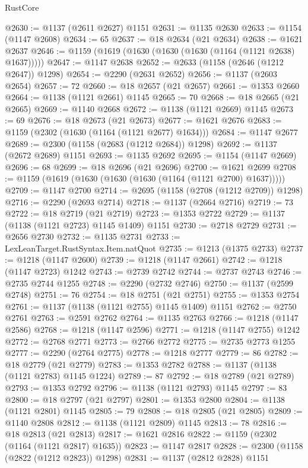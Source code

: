 \begin{lexlean}{RustCore}
\begin{coremodule}
@2630 := @1137 (@2611 @2627) @1151
@2631 := @1135 @2630
@2633 := @1154 (@1147 @2608)
@2634 := 65
@2637 := @18 @2634 (@21 @2634)
@2638 := @1621 @2637
@2646 := @1159 (@1619 (@1630 (@1630 (@1630 (@1164 (@1121 @2638) @1637)))))
@2647 := @1147 @2638
@2652 := @2633 (@1158 (@2646 (@1212 @2647)) @1298)
@2654 := @2290 (@2631 @2652)
@2656 := @1137 (@2603 @2654)
@2657 := 72
@2660 := @18 @2657 (@21 @2657)
@2661 := @1353 @2660
@2664 := @1138 (@1121 @2661) @1145
@2665 := 70
@2668 := @18 @2665 (@21 @2665)
@2669 := @1140 @2668
@2672 := @1138 (@1121 @2669) @1145
@2673 := 69
@2676 := @18 @2673 (@21 @2673)
@2677 := @1621 @2676
@2683 := @1159 (@2302 (@1630 (@1164 (@1121 @2677) @1634)))
@2684 := @1147 @2677
@2689 := @2300 (@1158 (@2683 (@1212 @2684)) @1298)
@2692 := @1137 (@2672 @2689) @1151
@2693 := @1135 @2692
@2695 := @1154 (@1147 @2669)
@2696 := 68
@2699 := @18 @2696 (@21 @2696)
@2700 := @1621 @2699
@2708 := @1159 (@1619 (@1630 (@1630 (@1630 (@1164 (@1121 @2700) @1637)))))
@2709 := @1147 @2700
@2714 := @2695 (@1158 (@2708 (@1212 @2709)) @1298)
@2716 := @2290 (@2693 @2714)
@2718 := @1137 (@2664 @2716)
@2719 := 73
@2722 := @18 @2719 (@21 @2719)
@2723 := @1353 @2722
@2729 := @1137 (@1138 (@1121 @2723) @1145 @1409) @1151
@2730 := @2718 @2729
@2731 := @2656 @2730
@2732 := @1135 @2731
@2733 := LexLeanTarget.RustSyntax.Item.natQuot
@2735 := @1213 (@1375 @2733)
@2737 := @1218 (@1147 @2600)
@2739 := @1218 (@1147 @2661)
@2742 := @1218 (@1147 @2723) @1242
@2743 := @2739 @2742
@2744 := @2737 @2743
@2746 := @2735 @2744 @1255
@2748 := @2290 (@2732 @2746)
@2750 := @1137 (@2599 @2748)
@2751 := 76
@2754 := @18 @2751 (@21 @2751)
@2755 := @1353 @2754
@2761 := @1137 (@1138 (@1121 @2755) @1145 @1409) @1151
@2762 := @2750 @2761
@2763 := @2591 @2762
@2764 := @1135 @2763
@2766 := @1218 (@1147 @2586)
@2768 := @1218 (@1147 @2596)
@2771 := @1218 (@1147 @2755) @1242
@2772 := @2768 @2771
@2773 := @2766 @2772
@2775 := @2735 @2773 @1255
@2777 := @2290 (@2764 @2775)
@2778 := @1218 @2777
@2779 := 86
@2782 := @18 @2779 (@21 @2779)
@2783 := @1353 @2782
@2788 := @1137 (@1138 (@1121 @2783) @1145 @1224)
@2789 := 87
@2792 := @18 @2789 (@21 @2789)
@2793 := @1353 @2792
@2796 := @1138 (@1121 @2793) @1145
@2797 := 83
@2800 := @18 @2797 (@21 @2797)
@2801 := @1353 @2800
@2804 := @1138 (@1121 @2801) @1145
@2805 := 79
@2808 := @18 @2805 (@21 @2805)
@2809 := @1140 @2808
@2812 := @1138 (@1121 @2809) @1145
@2813 := 78
@2816 := @18 @2813 (@21 @2813)
@2817 := @1621 @2816
@2822 := @1159 (@2302 (@1164 (@1121 @2817) @1635))
@2823 := @1147 @2817
@2828 := @2300 (@1158 (@2822 (@1212 @2823)) @1298)
@2831 := @1137 (@2812 @2828) @1151

\end{coremodule}
\end{lexlean}
